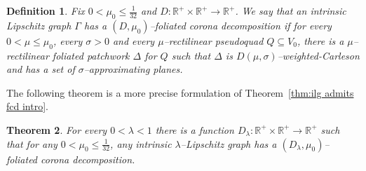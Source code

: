 \documentclass[11pt,reqno]{amsart}
\newcommand{\R}{\mathbb{R}}
\newcommand{\0}{\mathbf{0}}
\renewcommand{\1}{\mathbf 1}
\newcommand{\from}{\colon}
\renewcommand{\subset}{\subseteq}
\renewcommand{\le}{\leqslant}
\newtheorem{thm}{Theorem}[section]
\newtheorem{defn}[thm]{Definition}
\theoremstyle{remark}
\begin{document}


\begin{defn} \label{def:foliated corona}
  Fix $0<\mu_0\le \frac{1}{32}$ and $D\from \R^+\times \R^+\to \R^+$.  We say that an intrinsic Lipschitz graph $\Gamma$ has a \emph{$(D,\mu_0)$--foliated corona decomposition} if for every $0<\mu\le \mu_0$, every $\sigma>0$ and every $\mu$--rectilinear pseudoquad $Q\subset V_0$, there is a $\mu$--rectilinear foliated patchwork $\Delta$ for $Q$ such that $\Delta$ is $D(\mu,\sigma)$--weighted-Carleson and has a set of $\sigma$--approximating planes.
\end{defn}

The following theorem is a more precise formulation of Theorem~\ref{thm:ilg admits fcd intro}.

\begin{thm}\label{thm:corona graph formulated} For every $0<\lambda<1$  there is a function $D_\lambda\from \R^+\times \R^+\to \R^+$ such that for any $0<\mu_0\le \frac{1}{32}$, any intrinsic $\lambda$--Lipschitz graph has a $(D_\lambda,\mu_0)$--foliated corona decomposition.
\end{thm}
\end{document}
